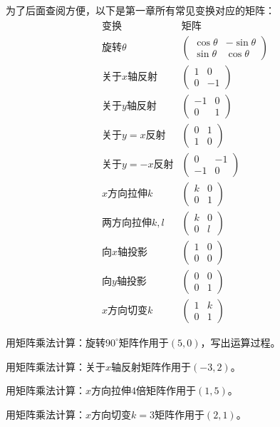 为了后面查阅方便，以下是第一章所有常见变换对应的矩阵：
\[
\begin{array}{c|c}
\text{变换} & \text{矩阵}\\\hline
\text{旋转$\theta$} & \begin{pmatrix}\cos\theta&-\sin\theta\\\sin\theta&\cos\theta\end{pmatrix}\\[2mm]
\text{关于$x$轴反射} & \begin{pmatrix}1&0\\0&-1\end{pmatrix}\\[2mm]
\text{关于$y$轴反射} & \begin{pmatrix}-1&0\\0&1\end{pmatrix}\\[2mm]
\text{关于$y=x$反射} & \begin{pmatrix}0&1\\1&0\end{pmatrix}\\[2mm]
\text{关于$y=-x$反射} & \begin{pmatrix}0&-1\\-1&0\end{pmatrix}\\[2mm]
\text{$x$方向拉伸$k$} & \begin{pmatrix}k&0\\0&1\end{pmatrix}\\[2mm]
\text{两方向拉伸$k,l$} & \begin{pmatrix}k&0\\0&l\end{pmatrix}\\[2mm]
\text{向$x$轴投影} & \begin{pmatrix}1&0\\0&0\end{pmatrix}\\[2mm]
\text{向$y$轴投影} & \begin{pmatrix}0&0\\0&1\end{pmatrix}\\[2mm]
\text{$x$方向切变$k$} & \begin{pmatrix}1&k\\0&1\end{pmatrix}
\end{array}
\]

\begin{exercise}
\item 用矩阵乘法计算：旋转$90^\circ$矩阵作用于$(5,0)$，写出运算过程。
\item 用矩阵乘法计算：关于$x$轴反射矩阵作用于$(-3,2)$。
\item 用矩阵乘法计算：$x$方向拉伸$4$倍矩阵作用于$(1,5)$。
\item 用矩阵乘法计算：$x$方向切变$k=3$矩阵作用于$(2,1)$。
\end{exercise}

